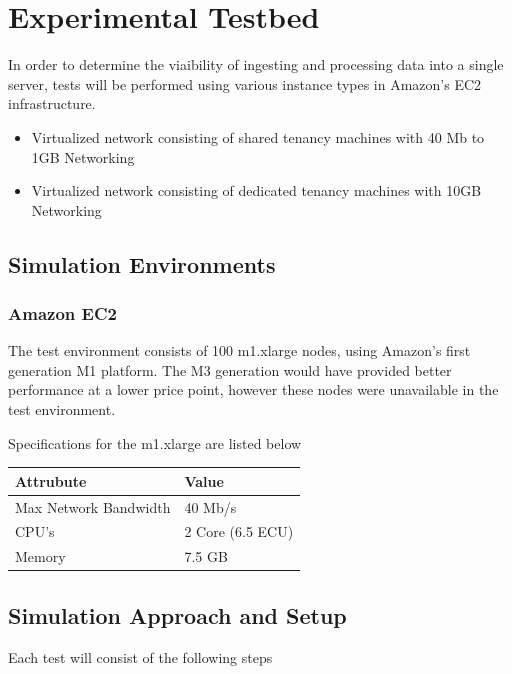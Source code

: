 \documentclass{llncs}
\begin{document}
\section{Experimental Testbed}

In order to determine the viaibility of ingesting and processing data into a single server, tests will be performed using various instance types in Amazon's EC2 infrastructure.

\begin{itemize}
\item Virtualized network consisting of shared tenancy machines with 40 Mb to 1GB Networking
\item Virtualized network consisting of dedicated tenancy machines with 10GB Networking
\end{itemize}

\subsection{Simulation Environments}

\subsubsection{Amazon EC2}

The test environment consists of 100 m1.xlarge nodes, using Amazon's first generation M1 platform. The M3 generation would have provided better performance at a lower price point, however these nodes were unavailable in the test environment.

Specifications for the m1.xlarge are listed below

\begin{flushleft}
    \begin{tabular}{ | l | l |}
    \hline
  Attrubute & Value  \\ \hline
Max Network Bandwidth &  40 Mb/s	\\ \hline
CPU's &  2 Core (6.5 ECU)	\\ \hline
Memory &  7.5 GB	\\ 
    \hline
    \end{tabular}
\end{flushleft}

\subsection{Simulation Approach and Setup}

Each test will consist of the following steps
\end{document}
